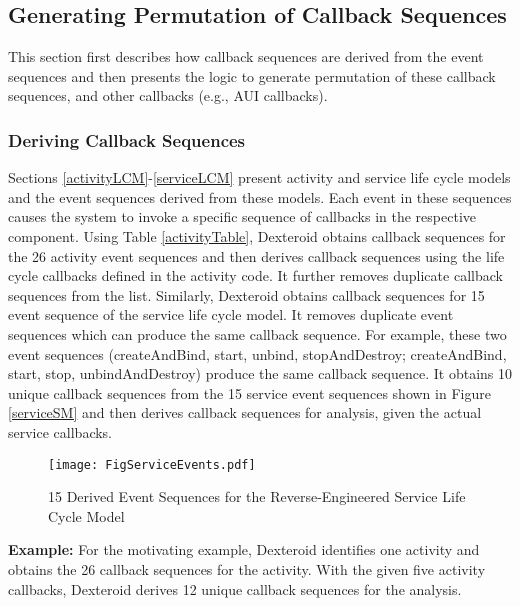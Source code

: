 \documentclass[10pt]{elsarticle}
\begin{document}
\subsection {Generating Permutation of Callback Sequences}

This section first describes how callback sequences are derived from the event sequences and then presents the logic to generate permutation of these callback sequences, and other callbacks (e.g., AUI callbacks).

\subsubsection{Deriving Callback Sequences}

Sections \ref{activityLCM}-\ref{serviceLCM} present activity and service life cycle models and the event sequences derived from these models. Each event in these sequences causes the system to invoke a specific sequence of callbacks in the respective component. Using Table \ref{activityTable}, Dexteroid obtains callback sequences for the 26 activity event sequences and then derives callback sequences using the life cycle callbacks defined in the activity code. It further removes duplicate callback sequences from the list. Similarly, Dexteroid obtains callback sequences for 15 event sequence of the service life cycle model. It removes duplicate event sequences which can produce the same callback sequence. For example, these two event sequences (createAndBind, start, unbind, stopAndDestroy; createAndBind, start, stop, unbindAndDestroy) produce the same callback sequence. It obtains 10 unique callback sequences from the 15 service event sequences shown in Figure \ref{serviceSM} and then derives callback sequences for analysis, given the actual service callbacks. 


\begin{figure}[ht]
\centering
\texttt{[image: FigServiceEvents.pdf]}
\caption{15 Derived Event Sequences for the Reverse-Engineered Service Life Cycle Model}
\label{serviceEvents}
\end{figure}

{\noindent \bf Example:} \label {scenariosExample} For the motivating example, Dexteroid identifies one activity and obtains the 26 callback sequences for the activity. With the given five activity callbacks, Dexteroid derives 12 unique callback sequences for the analysis.

\newcommand*{\permcomb}[4][0mu]{{{}^{#3}\mkern#1#2_{#4}}}
\newcommand*{\perm}[1][-3mu]{\permcomb[#1]{P}}
\end{document}
